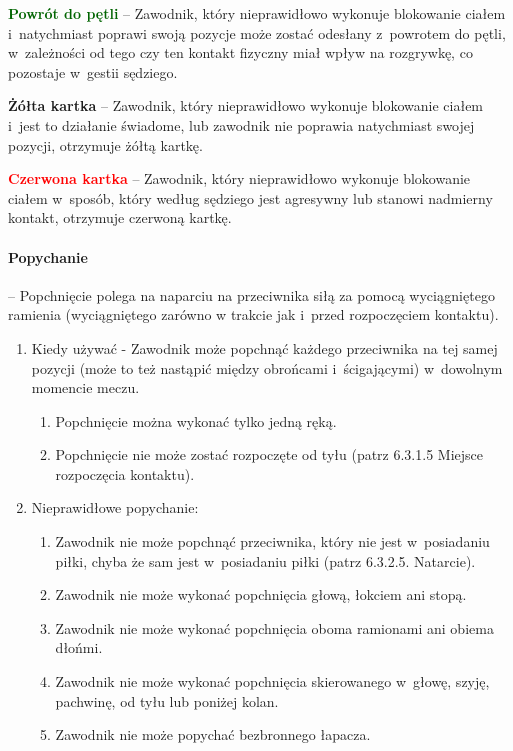 \documentclass[12pt]{article}
\newcommand\redcard[1]{\bgroup\textcolor{red}{\textbf{#1}}}
\newcommand\yellowcard[1]{\bgroup\textcolor{darkyellow}{\textbf{#1}}}
\newcommand\other[1]{\bgroup\textcolor{darkgreen}{\textbf{#1}}}
\begin{document}
\other{Powrót do pętli} -- Zawodnik, który nieprawidłowo wykonuje
blokowanie ciałem i~natychmiast poprawi swoją pozycje może zostać
odesłany z~powrotem do pętli, w~zależności od tego czy ten kontakt
fizyczny miał wpływ na rozgrywkę, co pozostaje w~gestii sędziego.

\yellowcard{Żółta kartka} -- Zawodnik, który nieprawidłowo wykonuje blokowanie
ciałem i~jest to działanie świadome, lub zawodnik nie poprawia
natychmiast swojej pozycji, otrzymuje żółtą kartkę.

\redcard{Czerwona kartka} -- Zawodnik, który nieprawidłowo wykonuje
blokowanie ciałem w~sposób, który według sędziego jest agresywny lub
stanowi nadmierny kontakt, otrzymuje czerwoną kartkę.

\paragraph{Popychanie} -- Popchnięcie polega na naparciu na
przeciwnika siłą za pomocą wyciągniętego ramienia (wyciągniętego zarówno
w trakcie jak i~przed rozpoczęciem kontaktu).

\begin{enumerate}
	\item
	      Kiedy używać - Zawodnik może popchnąć każdego przeciwnika na tej samej
	      pozycji (może to też nastąpić między obrońcami i~ścigającymi) w~dowolnym momencie meczu.

	      \begin{enumerate}
		      \item
		            Popchnięcie można wykonać tylko jedną ręką.
		      \item
		            Popchnięcie nie może zostać rozpoczęte od tyłu (patrz 6.3.1.5
		            Miejsce rozpoczęcia kontaktu).
	      \end{enumerate}
	\item
	      Nieprawidłowe popychanie:

	      \begin{enumerate}
		      \item
		            Zawodnik nie może popchnąć przeciwnika, który nie jest w~posiadaniu
		            piłki, chyba że sam jest w~posiadaniu piłki (patrz 6.3.2.5.
		            Natarcie).
		      \item
		            Zawodnik nie może wykonać popchnięcia głową, łokciem ani stopą.
		      \item
		            Zawodnik nie może wykonać popchnięcia oboma ramionami ani obiema
		            dłońmi.
		      \item
		            Zawodnik nie może wykonać popchnięcia skierowanego w~głowę, szyję,
		            pachwinę, od tyłu lub poniżej kolan.
		      \item
		            Zawodnik nie może popychać bezbronnego łapacza.
	      \end{enumerate}
\end{enumerate}
\end{document}
